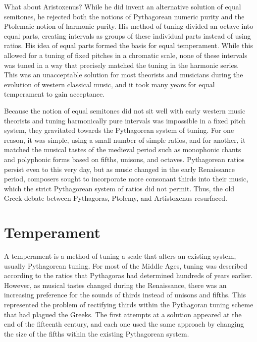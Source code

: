 What about Aristoxenus? While he did invent an alternative solution of equal semitones, he rejected both the notions of
Pythagorean numeric purity and the Ptolemaic notion of harmonic purity. His method of tuning divided an octave into
equal parts, creating intervals as groups of these individual parts instead of using ratios. His idea of equal parts
formed the basis for equal temperament. While this allowed for a tuning of fixed pitches in a chromatic scale, none of
these intervals was tuned in a way that precisely matched the tuning in the harmonic series. This was an unacceptable
solution for most theorists and musicians during the evolution of western classical music, and it took many years for
equal temperament to gain acceptance.

Because the notion of equal semitones did not sit well with early western music theorists and tuning harmonically pure
intervals was impossible in a fixed pitch system, they gravitated towards the Pythagorean system of tuning. For one
reason, it was simple, using a small number of simple ratios, and for another, it matched the musical tastes of the
medieval period such as monophonic chants and polyphonic forms based on fifths, unisons, and octaves. Pythagorean
ratios persist even to this very day, but as music changed in the early Renaissance period, composers sought to
incorporate more consonant thirds into their music, which the strict Pythagorean system of ratios did not permit. Thus,
the old Greek debate between Pythagoras, Ptolemy, and Artistoxenus resurfaced.

\section{Temperament}

A temperament is a method of tuning a scale that alters an existing system, usually Pythagorean tuning. For most of the
Middle Ages, tuning was described according to the ratios that Pythagoras had determined hundreds of years earlier.
However, as musical tastes changed during the Renaissance, there was an increasing preference for the sounds of thirds
instead of unisons and fifths. This represented the problem of rectifying thirds within the Pythagoran tuning scheme
that had plagued the Greeks. The first attempts at a solution appeared at the end of the fifteenth century, and each one
used the same approach by changing the size of the fifths within the existing Pythagorean system.

